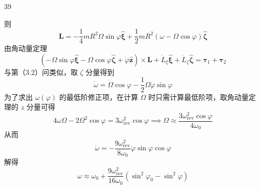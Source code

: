 \begin{solution}{39}
\begin{subsolution}
\begin{subsubsolution}
            则
            \begin{equation}
                \pmb {L} = - \frac {1}{4} m R ^ {2} \varOmega \sin \varphi \hat {\pmb {\xi}} + \frac {1}{2} m R ^ {2} (\omega - \varOmega \cos \varphi) \hat {\pmb {\zeta}}
                \label{eq:26.s39}
            \end{equation}
            由角动量定理
            \begin{equation}
                (- \varOmega \sin \varphi \hat {\pmb {\xi}} - \varOmega \cos \varphi \hat {\pmb {\zeta}} + \dot {\varphi} \hat {\pmb {z}}) \times \pmb {L} + \dot {L} _ {\xi} \hat {\pmb {\xi}} + \dot {L} _ {\zeta} \hat {\pmb {\zeta}} = \pmb {\tau} _ {1} + \pmb {\tau} _ {2}
                \label{eq:27.s39}
            \end{equation}
            与第（3.2）问类似，取 $\zeta$ 分量得到
            \begin{equation}
                \dot {\omega} = \dot {\varOmega} \cos \varphi - \frac {1}{2} \varOmega \dot {\varphi} \sin \varphi
                \label{eq:28.s39}
            \end{equation}
            为了求出 $\omega (\varphi)$ 的最低阶修正项，在计算 $\Omega$ 时只需计算最低阶项，取角动量定理的 $z$ 分量可得
            \begin{equation}
                4 \omega \varOmega - 2 \varOmega^ {2} \cos \varphi = 3 \omega_ {\mathrm{rev}} ^ {2} \cos \varphi \implies \varOmega \approx \frac {3 \omega_ {\mathrm{rev}} ^ {2} \cos \varphi}{4 \omega_ {0}}
                \label{eq:29.s39}
            \end{equation}
            从而
            \begin{equation}
                \dot {\omega} = - \frac {9 \omega_ {\mathrm{rev}} ^ {2}}{8 \omega_ {0}} \dot {\varphi} \sin \varphi \cos \varphi
                \label{eq:30.s39}
            \end{equation}
            解得
            \begin{equation}
                \omega \approx \omega_ {0} + \frac {9 \omega_ {\mathrm{rev}} ^ {2}}{1 6 \omega_ {0}} (\sin^ {2} \varphi_ {0} - \sin^ {2} \varphi)
                \label{eq:31.s39}
            \end{equation}
        \end{subsubsolution}
    \end{subsolution}
\end{solution}